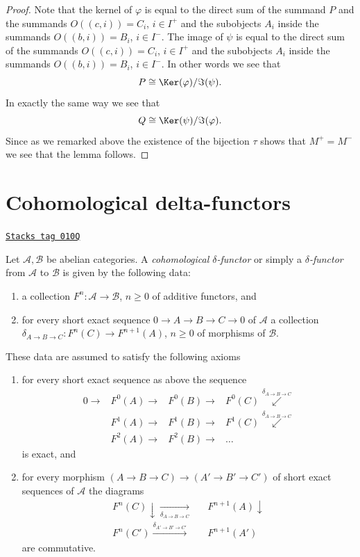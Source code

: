 \begin{proof}
\medskip\noindent
Note that the kernel of $\varphi$ is equal to the direct sum of the
summand $P$ and the summands $O((c, i)) = C_i$, $i \in I^{+}$ and
the subobjects $A_i$ inside the summands $O((b, i)) = B_i$, $i \in I^{-}$.
The image of $\psi$ is equal to the direct sum of the
summands $O((c, i)) = C_i$, $i \in I^{+}$ and
the subobjects $A_i$ inside the summands $O((b, i)) = B_i$, $i \in I^{-}$.
In other words we see that
$$
P \cong \Ker(\varphi)/\Im(\psi).
$$
In exactly the same way we see that
$$
Q \cong \Ker(\psi)/\Im(\varphi).
$$
Since as we remarked above the existence of the bijection
$\tau$ shows that $M^{+} = M^{-}$ we see that the lemma follows.
\end{proof}

\section{Cohomological delta-functors}
\label{homology-section-cohomological-delta-functor}
\begin{definition}
\label{homology-definition-cohomological-delta-functor}
\href{https://stacks.math.columbia.edu/tag/010Q}{\texttt{Stacks tag 010Q}}

Let $\mathcal{A}, \mathcal{B}$ be abelian categories.
A {\it cohomological $\delta$-functor} or simply a
{\it $\delta$-functor} from $\mathcal{A}$
to $\mathcal{B}$ is given by the following data:
\begin{enumerate}
\item a collection $F^n : \mathcal{A} \to \mathcal{B}$, $n \geq 0$ of additive
functors, and
\item for every short exact sequence $0 \to A \to B \to C \to 0$
of $\mathcal{A}$
a collection $\delta_{A \to B \to C} : F^n(C) \to F^{n + 1}(A)$, $n \geq 0$
of morphisms of $\mathcal{B}$.
\end{enumerate}
These data are assumed to satisfy the following axioms
\begin{enumerate}
\item for every short exact sequence as above the sequence
$$
\begin{array}{cccc}0 \longrightarrow & F^0(A) \longrightarrow & F^0(B) \longrightarrow & F^0(C) \overset{\delta_{A \to B \to C}}{\swarrow} \\  & F^1(A) \longrightarrow & F^1(B) \longrightarrow & F^1(C) \overset{\delta_{A \to B \to C}}{\swarrow} \\  & F^2(A) \longrightarrow & F^2(B) \longrightarrow & \ldots\end{array}
$$
is exact, and
\item for every morphism $(A \to B \to C) \to (A' \to B' \to C')$
of short exact sequences of $\mathcal{A}$ the diagrams
$$
\begin{array}{ccc}F^n(C) \downarrow\underset{\delta_{A \to B \to C}}{\longrightarrow} &  & F^{n + 1}(A) \downarrow \\ F^n(C') \overset{\delta_{A' \to B' \to C'}}{\longrightarrow} &  & F^{n + 1}(A')\end{array}
$$
are commutative.
\end{enumerate}
\end{definition}

